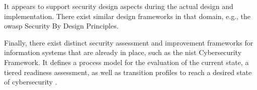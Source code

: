 

It appears to support security design aspects during the actual design and implementation. There exist similar design frameworks in that domain, e.g., the \ac{owasp} Security By Design Principles. %

Finally, there exist distinct security assessment and improvement frameworks for information systems that are already in place, such as the \ac{nist} Cybersecurity Framework. It defines a process model for the evaluation of the current state, a tiered readiness assessment, as well as transition profiles to reach a desired state of cybersecurity \cite{noauthor_framework_2018}.%

